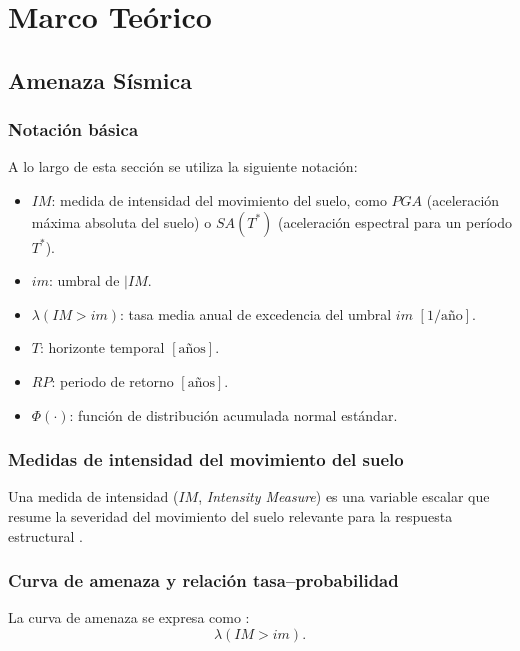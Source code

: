 \chapter{Marco Teórico}

\section{Amenaza Sísmica}

\subsection{Notación básica}

A lo largo de esta sección se utiliza la siguiente notación:
\begin{itemize}
    \item \(IM\): medida de intensidad del movimiento del suelo, como \(PGA\) (aceleración máxima absoluta del suelo) o \(SA(T^*)\) (aceleración espectral para un período \(T^*\)).
    \item \(im\): umbral de \(|IM\).
    \item \(\lambda(IM>im)\): tasa media anual de excedencia del umbral \(im\) \([\text{1/año}]\).
    \item \(T\): horizonte temporal \([\text{años}]\).
    \item \(RP\): periodo de retorno \([\text{años}]\).
    \item \(\Phi(\cdot)\): función de distribución acumulada normal estándar.
\end{itemize}

\subsection{Medidas de intensidad del movimiento del suelo}

Una medida de intensidad (\(IM\), \textit{Intensity Measure}) es una variable escalar que resume la severidad del movimiento del suelo relevante para la respuesta estructural \cite{BakerBradleyStafford2021}.

\subsection{Curva de amenaza y relación tasa--probabilidad}

La curva de amenaza se expresa como \cite{Cornell1968}:
\begin{equation}
\lambda(IM > im).
\label{eq:hazard_curve_def}
\end{equation}

